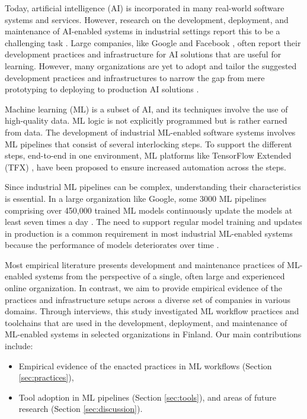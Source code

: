 Today, artificial intelligence (AI) is incorporated in many real-world software systems and services. However, research on the development, deployment, and maintenance of AI-enabled systems in industrial settings report this to be a challenging task \cite{Sculley2015, Lwakatare2019}. Large companies, like Google \cite{Baylor2017} and Facebook \cite{Hazelwood2018Facebook}, often report their development practices and infrastructure for AI solutions that are useful for learning. However, many organizations are yet to adopt and tailor the suggested development practices and infrastructures to narrow the gap from mere prototyping to deploying to production AI solutions \cite{Serban2020Practices}. 

Machine learning (ML) is a subset of AI, and its techniques involve the use of high-quality data. ML logic is not explicitly programmed but is rather earned from data. The development of industrial ML-enabled software systems involves ML pipelines that consist of several interlocking steps. To support the different steps, end-to-end in one environment, ML platforms like TensorFlow Extended (TFX) \cite{Baylor2017}, have been proposed to ensure increased automation across the steps.

Since industrial ML pipelines can be complex, understanding their characteristics is essential. In a large organization like Google, some 3000 ML pipelines comprising over 450,000 trained ML models continuously update the models at least seven times a day  \cite{Doris2021MLPipelines}. The need to support regular model training and updates in production is a common requirement in most industrial ML-enabled systems because the performance of models deteriorates over time  \cite{Sculley2015}.

Most empirical literature presents development and maintenance practices of ML-enabled systems from the perspective of a single, often large and experienced online organization. In contrast, we aim to provide empirical evidence of the practices and infrastructure setups across a diverse set of companies in various domains. Through interviews, this study investigated ML workflow practices and toolchains that are used in the development, deployment, and maintenance of ML-enabled systems in selected organizations in Finland. Our main contributions include:
\begin{itemize}
    \item Empirical evidence of the enacted practices in ML workflows  (Section \ref{sec:practices}),
    \item Tool adoption in ML pipelines (Section \ref{sec:tools}), and areas of future research (Section \ref{sec:discussion}).
\end{itemize}
